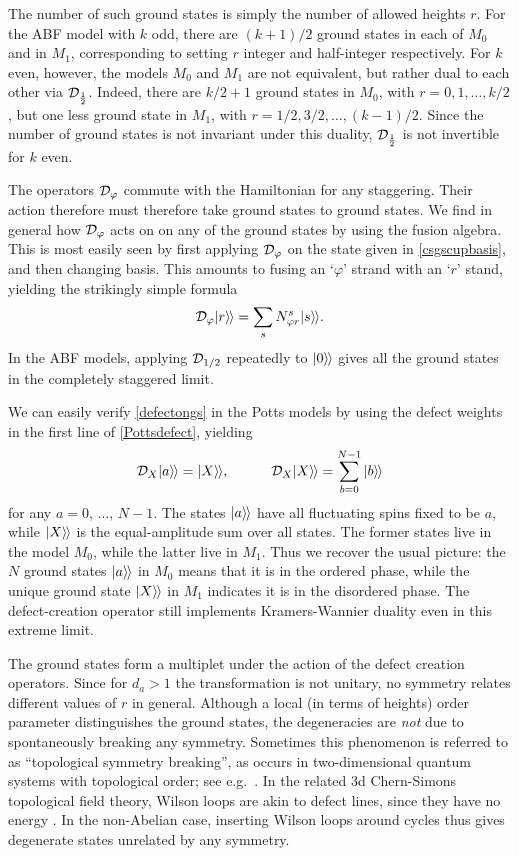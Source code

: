 The number of such ground states is simply the number of allowed heights $r$. For the ABF model with $k$ odd, there are $(k+1)/2$ ground states in each of $M_0$ and in $M_1$, corresponding to setting  $r$ integer and half-integer respectively.
For $k$ even, however, the models $M_0$ and $M_1$ are not equivalent, but rather dual to each other via $\mathcal{D}_{\frac12}$.
Indeed, there are $k/2+1$ ground states in $M_0$, with $r=0,1,\dots,k/2$, but one less ground state in $M_1$, with $r=1/2,3/2,\dots,(k-1)/2$.  
Since the number of ground states is not invariant under this duality, $\mathcal{D}_{\frac12}$ is not invertible for $k$ even. 

The operators $\mathcal{D}_\varphi$ commute with the Hamiltonian for any staggering. Their action therefore must therefore take ground states to ground states. We find in general how $\mathcal{D}_{\varphi}$ acts on on any of the ground states by using the fusion algebra.
This is most easily seen by first applying $\mathcal{D}_\varphi$ on the state given in \eqref{csgscupbasis}, and then changing basis.  This amounts to fusing an `$\varphi$' strand with an `$r$' stand, yielding the strikingly simple formula
\begin{align}
	\mathcal{D}_\varphi {|{r}\rangle\mkern-2mu\rangle} = \sum_{s} N_{\varphi r}^s {|{s}\rangle\mkern-2mu\rangle} .
	\label{defectongs}
\end{align}
In the ABF models, applying $\mathcal{D}_{1/2}$ repeatedly to ${|{0}\rangle\mkern-2mu\rangle}$ gives all the ground states in the completely staggered limit.

We can easily verify \eqref{defectongs} in the Potts models by using the defect weights in the first line of \eqref{Pottsdefect}, yielding \begin{align}
\mathcal{D}_{X} {|{a}\rangle\mkern-2mu\rangle} = {|{X}\rangle\mkern-2mu\rangle} , \qquad\quad 
\mathcal{D}_{X} {|{X}\rangle\mkern-2mu\rangle} = \sum_{b=0}^{N-1} {|{b}\rangle\mkern-2mu\rangle}
\label{DXa}
\end{align}
for any $a=0,\,\dots,\,N-1$.
The states ${|{a}\rangle\mkern-2mu\rangle}$ have all fluctuating spins fixed to be $a$, while ${|{X}\rangle\mkern-2mu\rangle}$ is the equal-amplitude sum over all states.
The former states live in the model $M_0$, while the latter live in $M_1$.
Thus we recover the usual picture: the $N$ ground states  ${|{a}\rangle\mkern-2mu\rangle}$ in $M_0$ means that it is in the ordered phase, while the unique ground state ${|{X}\rangle\mkern-2mu\rangle}$ in $M_1$ indicates it is in the disordered phase. The defect-creation operator still implements Kramers-Wannier duality even in this extreme limit. 



The ground states form a multiplet under the action of the defect creation operators. Since for $d_a>1$ the transformation is not unitary, no symmetry relates different values of $r$ in general. Although a local (in terms of heights) order parameter distinguishes the ground states, the degeneracies are {\em not} due to spontaneously breaking any symmetry. Sometimes this phenomenon is referred to as ``topological symmetry breaking'', as occurs in two-dimensional quantum systems with topological order; see e.g.\  \cite{Bais2009}. 
In the related 3d Chern-Simons topological field theory, Wilson loops are akin to defect lines, since they have no energy \cite{Nayak2008}. In the non-Abelian case, inserting Wilson loops around cycles thus gives degenerate states unrelated by any symmetry. 


